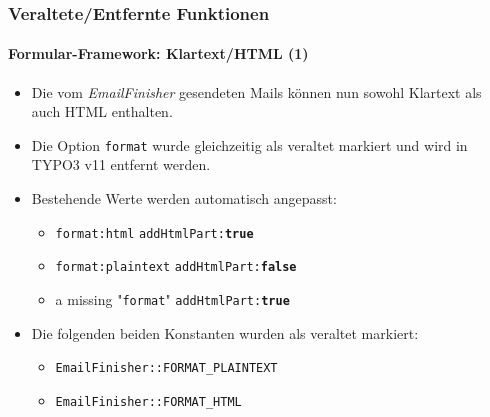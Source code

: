 
\begin{frame}[fragile]
	\frametitle{Veraltete/Entfernte Funktionen}
	\framesubtitle{Formular-Framework: Klartext/HTML (1)}

	\begin{itemize}
		\item Die vom \textit{EmailFinisher} gesendeten Mails können nun sowohl Klartext als auch HTML enthalten.

		\item Die Option \texttt{format} wurde gleichzeitig als veraltet markiert und wird in TYPO3 v11 entfernt werden.

		\item Bestehende Werte werden automatisch angepasst:

			\begin{itemize}\smaller
				\item \texttt{format:html} \tabto{3cm}\textrightarrow\hspace{0.1cm}\texttt{addHtmlPart:\textbf{true}}
				\item \texttt{format:plaintext} \tabto{3cm}\textrightarrow\hspace{0.1cm}\texttt{addHtmlPart:\textbf{false}}
				\item a missing "\texttt{format}" \tabto{3cm}\textrightarrow\hspace{0.1cm}\texttt{addHtmlPart:\textbf{true}}
			\end{itemize}\normalsize

		\item Die folgenden beiden Konstanten wurden als veraltet markiert:

			\begin{itemize}\smaller
				\item \texttt{EmailFinisher::FORMAT\_PLAINTEXT}
				\item \texttt{EmailFinisher::FORMAT\_HTML}
			\end{itemize}\normalsize

	\end{itemize}

\end{frame}


